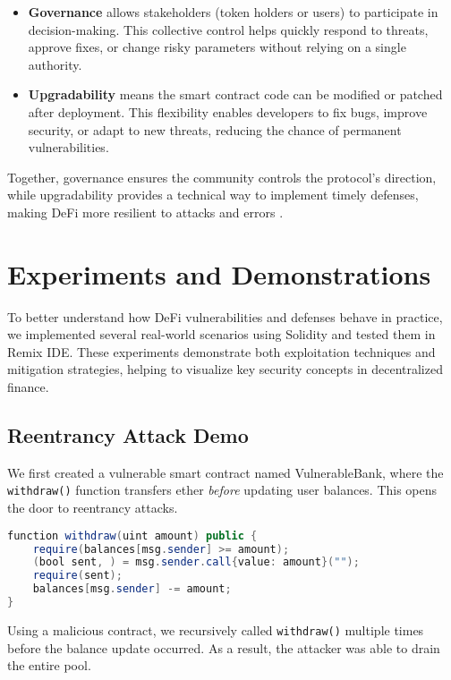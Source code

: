 \documentclass[conference]{IEEEtran}
\begin{document}
\begin{itemize}
    \item \textbf{Governance} allows stakeholders (token holders or users) to participate in decision-making. This collective control helps quickly respond to threats, approve fixes, or change risky parameters without relying on a single authority.
    \item \textbf{Upgradability} means the smart contract code can be modified or patched after deployment. This flexibility enables developers to fix bugs, improve security, or adapt to new threats, reducing the chance of permanent vulnerabilities.
\end{itemize}

Together, governance ensures the community controls the protocol's direction, while upgradability provides a technical way to implement timely defenses, making DeFi more resilient to attacks and errors \cite{defi_security_2023}.

\section{Experiments and Demonstrations}

To better understand how DeFi vulnerabilities and defenses behave in practice, we implemented several real-world scenarios using Solidity and tested them in Remix IDE. These experiments demonstrate both exploitation techniques and mitigation strategies, helping to visualize key security concepts in decentralized finance.

\subsection{Reentrancy Attack Demo}

We first created a vulnerable smart contract named VulnerableBank, where the \texttt{withdraw()} function transfers ether \emph{before} updating user balances. This opens the door to reentrancy attacks.

\begin{lstlisting}[language=Java, caption={Reentrancy bug in withdraw()}]
function withdraw(uint amount) public {
    require(balances[msg.sender] >= amount);
    (bool sent, ) = msg.sender.call{value: amount}("");
    require(sent);
    balances[msg.sender] -= amount;
}
\end{lstlisting}

Using a malicious contract, we recursively called \texttt{withdraw()} multiple times before the balance update occurred. As a result, the attacker was able to drain the entire pool.
\end{document}
